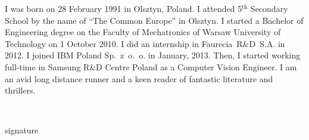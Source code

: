 \documentclass[12pt]{report}
\newcommand{\superscript}[1]{\ensuremath{^{\textrm{#1}}}}
\begin{document}
	I was born on 28 February 1991 in Olsztyn, Poland. I attended 5\superscript{th} Secondary School by the name of ``The Common Europe'' in Olsztyn. I started a Bachelor of Engineering degree on the Faculty of Mechatronics of Warsaw University of Technology on 1 October 2010. I did an internship in Faurecia~R\&D~S.A. in 2012. I joined IBM Poland Sp.~z~o.~o. in January, 2013. Then, I started working full-time in Samsung R\&D Centre Poland as a Computer Vision Engineer. I am an avid long distance runner and a keen reader of fantastic literature and thrillers.
	
    \par
    \vspace{3\baselineskip}
    \hfill\parbox{15em}{{\small\dotfill}\\[-.3ex]
    \centerline{\footnotesize signature}}\par
    \vspace{3\baselineskip}
    
    
\end{document}
